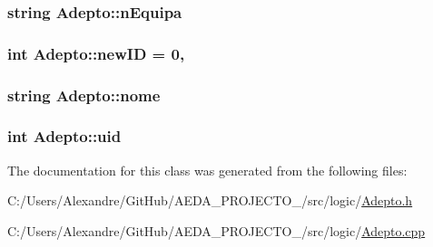 \subsubsection[{n\+Equipa}]{\setlength{\rightskip}{0pt plus 5cm}string Adepto\+::n\+Equipa\hspace{0.3cm}{\ttfamily [private]}}\label{class_adepto_a4d306b827599faf2eef7c6aee28c2a7f}
\hypertarget{class_adepto_a1255efa082f32bc2bab9fbe0790776aa}{}
\subsubsection[{new\+I\+D}]{\setlength{\rightskip}{0pt plus 5cm}int Adepto\+::new\+I\+D = 0\hspace{0.3cm}{\ttfamily [static]}, {\ttfamily [private]}}\label{class_adepto_a1255efa082f32bc2bab9fbe0790776aa}
\hypertarget{class_adepto_affdc168657d04f7c3622fda86815e195}{}
\subsubsection[{nome}]{\setlength{\rightskip}{0pt plus 5cm}string Adepto\+::nome\hspace{0.3cm}{\ttfamily [private]}}\label{class_adepto_affdc168657d04f7c3622fda86815e195}
\hypertarget{class_adepto_a63a2ece257caf45c0c8ec6d04c19fe0b}{}
\subsubsection[{uid}]{\setlength{\rightskip}{0pt plus 5cm}int Adepto\+::uid\hspace{0.3cm}{\ttfamily [private]}}\label{class_adepto_a63a2ece257caf45c0c8ec6d04c19fe0b}


The documentation for this class was generated from the following files\+:\begin{DoxyCompactItemize}
\item 
C\+:/\+Users/\+Alexandre/\+Git\+Hub/\+A\+E\+D\+A\+\_\+\+P\+R\+O\+J\+E\+C\+T\+O\+\_/src/logic/\hyperlink{_adepto_8h}{Adepto.\+h}\item 
C\+:/\+Users/\+Alexandre/\+Git\+Hub/\+A\+E\+D\+A\+\_\+\+P\+R\+O\+J\+E\+C\+T\+O\+\_/src/logic/\hyperlink{_adepto_8cpp}{Adepto.\+cpp}\end{DoxyCompactItemize}

